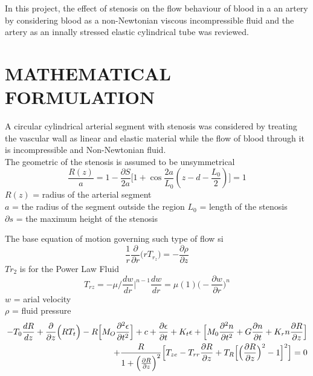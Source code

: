 \documentclass[12pt]{report}
\newcommand{\sps}{\\[0.2cm]}
\newcommand{\NI}{\noindent}
\begin{document}
	\NI In this project, the effect of stenosis on the flow behaviour of blood in a an artery by considering blood as a non-Newtonian viscous incompressible fluid and the artery as an innally stressed elastic cylindrical tube was reviewed.
	
	
	\chapter{MATHEMATICAL FORMULATION}
	A circular cylindrical arterial segment with stenosis was considered by treating the vascular wall as linear and elastic material while the flow of blood through it is incompressible and Non-Newtonian fluid.\sps
	
	The geometric of the stenosis is assumed to be unsymmetrical  \begin{equation}
		\frac{R(z)}{a} = 1 - \frac{\partial S}{2a}\Big[1 + \cos \frac{2a}{L_0}(z - d - \frac{L_0}{2})\Big] = 1 
	\end{equation}
	$R(z)$ = radius of the arterial segment\sps
	$a$ = the radius of the segment outside the region
	$L_0$ = length of the stenosis\sps
	$\partial s$ = the maximum height of the stenosis
	
	
	\NI The base equation of motion governing such type of flow si
	\begin{equation}
		\frac{1}{r}\frac{\partial}{\partial r}\Big(r T_{r_z}\Big) = - \frac{\partial \rho}{\partial z}
	\end{equation}
	$Tr_2$ is for the Power Law Fluid\sps
	\begin{equation*}
		T_{rz} = - \mu / \frac{dw}{dr}\Big|^{n-1} \frac{dw}{dr} = \mu(1)\Big(-\frac{\partial w}{\partial r}\Big)^n
	\end{equation*}
	$w$ = arial velocity\sps
	$\rho$ = fluid pressure\sps
	
	\begin{eqnarray}
		-T_0\frac{dR}{dz} + \frac{\partial}{\partial z}\Big(RT_t\Big) - R\Big[M_O\frac{\partial^2\epsilon}{\partial t^2}\Big] + c + \frac{\partial \epsilon}{\partial t} + K_t \epsilon + \Big[M_0\frac{\partial^2 n}{\partial t^2} + G\frac{\partial n}{\partial t} + K_r n\frac{\partial R}{\partial z}\Big]\notag\\
		+ \frac{R}{1 + \Big(\frac{\partial R}{\partial z}\Big)^2}\Big[T_{ze} - T_{rr}\frac{\partial R}{\partial z} + T_R \Big[\Big(\frac{\partial R}{\partial z}\Big)^2 - 1\Big]^2\Big] = 0 \notag
	\end{eqnarray}
\end{document}
